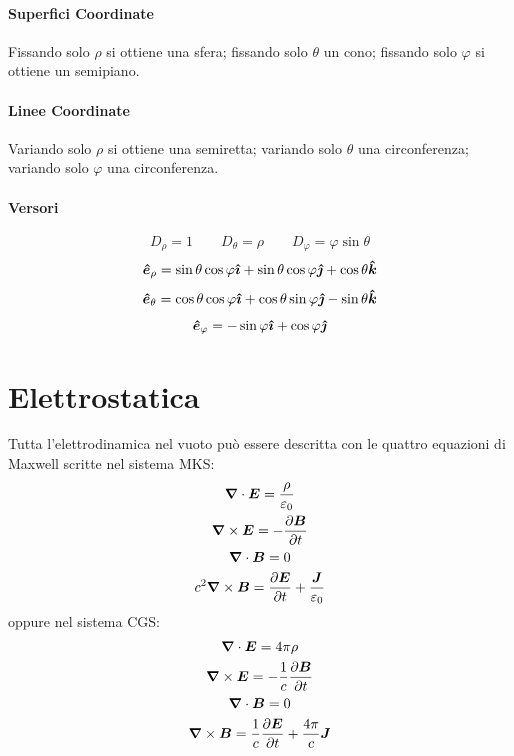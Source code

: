 \subsubsection{Superfici Coordinate}
Fissando solo $\rho$ si ottiene una sfera; fissando solo $\theta$ un cono; fissando solo $\varphi$ si ottiene un semipiano.
\subsubsection{Linee Coordinate}
Variando solo $\rho$ si ottiene una semiretta; variando solo $\theta$ una circonferenza; variando solo $\varphi$ una circonferenza.
\subsubsection{Versori}
\[D_\rho=1\qquad D_\theta=\rho\qquad D_\varphi=\varphi\sin\theta\]
\[\boldsymbol{\hat {e}}_\rho=\sin\theta\cos\varphi\boldsymbol{\hat {\imath}}+\sin\theta\cos\varphi\boldsymbol{\hat {\jmath}}+\cos\theta\boldsymbol{\hat {k}}\]
\[\boldsymbol{\hat {e}}_\theta=\cos\theta\cos\varphi\boldsymbol{\hat {\imath}}+\cos\theta\sin\varphi\boldsymbol{\hat {\jmath}}-\sin\theta\boldsymbol{\hat {k}}\]
\[\boldsymbol{\hat {e}}_\varphi=-\sin\varphi\boldsymbol{\hat {\imath}}+\cos\varphi\boldsymbol{\hat {\jmath}}\]

\chapter{Elettrostatica}
\minitoc
Tutta l'elettrodinamica nel vuoto può essere descritta con le quattro equazioni di Maxwell
 scritte nel sistema MKS:
\begin{subequations}
  \begin{gather}
    \boldsymbol{\nabla}\cdot\boldsymbol{E}=\frac{\rho}{\varepsilon_0}\\
    \boldsymbol{\nabla}\times\boldsymbol{E}=-\frac{\partial \boldsymbol{B}}{\partial t}\\
    \boldsymbol{\nabla} \cdot \boldsymbol{B}=0\\
    c^2\boldsymbol{\nabla}\times \boldsymbol{B}=\frac{\partial \boldsymbol{E}}{\partial t}+\frac{\boldsymbol{J}}{\varepsilon_0}
  \end{gather}
\end{subequations}
oppure nel sistema CGS:
\begin{subequations}
  \begin{gather}
    \boldsymbol{\nabla}\cdot\boldsymbol{E}=4\pi\rho\\
    \boldsymbol{\nabla}\times\boldsymbol{E}=-\frac{1}{c}\frac{\partial \boldsymbol{B}}{\partial t}\\
    \boldsymbol{\nabla} \cdot \boldsymbol{B}=0\\
    \boldsymbol{\nabla}\times \boldsymbol{B}=\frac{1}{c}\frac{\partial \boldsymbol{E}}{\partial t}+\frac{4\pi}{c}\boldsymbol{J}
  \end{gather}
\end{subequations}

